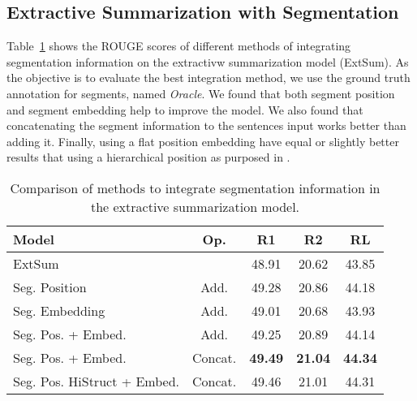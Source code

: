 \documentclass[sigconf]{acmart}
\begin{document}
\subsection{Extractive Summarization with Segmentation}
Table~\ref{tab:results:int} shows the ROUGE scores of different methods of integrating segmentation information on the extractivw summarization model (ExtSum). As the objective is to evaluate the best integration method, we use the ground truth annotation for segments, named \emph{Oracle}. We found that both segment position and segment embedding help to improve the model. We also found that concatenating the segment information to the sentences input works better than adding it. Finally, using a flat position embedding have equal or slightly better results that using a hierarchical position as purposed in \cite{ruan-etal-2022-histruct}.

\begin{table}
	\centering
	\begin{adjustbox}{width=\linewidth}
	\begin{tabular}{l c c c c} 
		\toprule
		\textbf{Model} & \textbf{Op.} & \textbf{R1} &  \textbf{R2} &  \textbf{RL} \\ \hline
            ExtSum	 & &	48.91	&20.62	&43.85\\
            \quad Seg. Position &	Add.	&49.28	&20.86	&44.18\\
            \quad Seg. Embedding &	Add.	&49.01	&20.68	&43.93\\
            \quad Seg. Pos. + Embed. & 	Add.	&49.25	&20.89	&44.14\\
            \quad Seg. Pos. + Embed. 	& Concat.	&\textbf{49.49}	& \textbf{21.04}	& \textbf{44.34}\\
            \quad Seg. Pos. HiStruct + Embed.		& Concat.	&49.46	&21.01	&44.31\\ \hline
    \end{tabular} 
	\end{adjustbox}
	\caption{Comparison of methods to integrate segmentation information in the extractive summarization model.}
	\label{tab:results:int}
\end{table}
\end{document}
